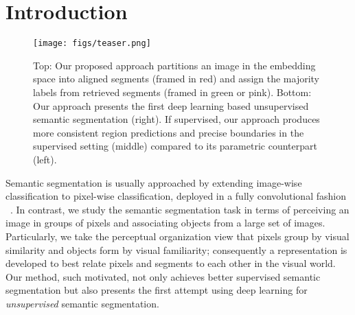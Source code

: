 \documentclass[10pt,twocolumn,letterpaper]{article}
\begin{document}
 
\section{Introduction}
\label{sec:intro}



\begin{figure}[t]
    \centering
    \texttt{[image: figs/teaser.png]}
    \caption{
Top: Our proposed approach partitions an image in the embedding space into aligned segments (framed in red) and assign the majority labels from retrieved segments (framed in green or pink). Bottom: Our approach presents the first deep learning based unsupervised semantic segmentation (right). If supervised, our approach produces more consistent region predictions and precise boundaries in the supervised setting (middle) compared to its parametric counterpart (left).
}
    \label{fig:teaser}
\end{figure}

















Semantic segmentation is usually approached by extending image-wise classification \cite{lecun1989backpropagation,krizhevsky2012imagenet} to pixel-wise classification, deployed in a fully convolutional fashion ~\cite{long2015fully}.
In contrast, we study the semantic segmentation task in terms of perceiving an image in groups of pixels and associating objects from a large set of images.
Particularly, we take the perceptual organization view \cite{tenenbaum1983role, biederman1987recognition} that pixels group by visual similarity and objects form by visual familiarity; consequently a representation is developed to best relate pixels and segments to each other in the visual world.
Our method, such motivated, not only achieves better supervised semantic segmentation but also presents the first attempt using deep learning for {\it unsupervised} semantic segmentation.
\end{document}
